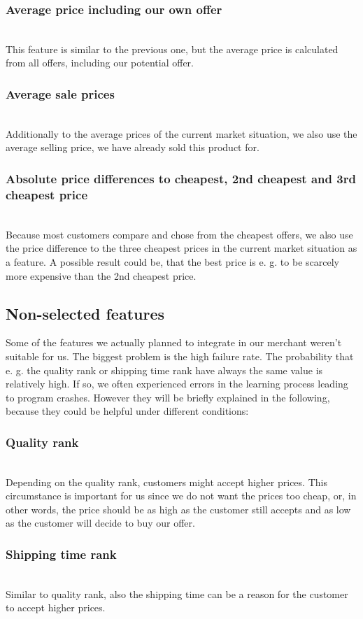 	\subsubsection{Average price including our own offer}
		~\\
		This feature is similar to the previous one, but the average price is calculated from all offers, including our potential offer.
	\subsubsection{Average sale prices}
		~\\
		Additionally to the average prices of the current market situation, we also use the average selling price, we have already sold this product for.
	\subsubsection{Absolute price differences to cheapest, 2nd cheapest and 3rd cheapest price}
		~\\
		Because most customers compare and chose from the cheapest offers, we also use the price difference to the three cheapest prices in the current market situation as a feature. A possible result could be, that the best price is e. g. to be scarcely more expensive than the 2nd cheapest price.
\subsection{Non-selected features}
	Some of the features we actually planned to integrate in our merchant weren't suitable for us. The biggest problem is the high failure rate. The probability that e. g. the quality rank or shipping time rank have always the same value is relatively high. If so, we often experienced errors in the learning process leading to program crashes. However they will be briefly explained in the following, because they could be helpful under different conditions:
	\subsubsection{Quality rank}
		~\\
		Depending on the quality rank, customers might accept higher prices. This circumstance is important for us since we do not want the prices too cheap, or, in other words, the price should be as high as the customer still accepts and as low as the customer will decide to buy our offer.
	\subsubsection{Shipping time rank}
		~\\
		Similar to quality rank, also the shipping time can be a reason for the customer to accept higher prices.
